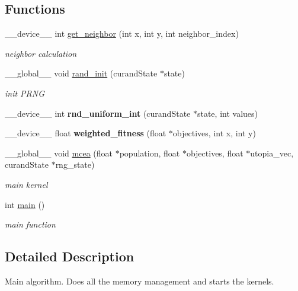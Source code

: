 \subsection*{Functions}
\begin{DoxyCompactItemize}
\item 
\+\_\+\+\_\+device\+\_\+\+\_\+ int \hyperlink{mcea_8cu_acab27e83eac8a2ce0b5e36cbaa955669}{get\+\_\+neighbor} (int x, int y, int neighbor\+\_\+index)
\begin{DoxyCompactList}\small\item\em neighbor calculation \end{DoxyCompactList}\item 
\+\_\+\+\_\+global\+\_\+\+\_\+ void \hyperlink{mcea_8cu_a5b010aff6f775f55f906e1e4c6fa34e1}{rand\+\_\+init} (curand\+State $\ast$state)
\begin{DoxyCompactList}\small\item\em init P\+R\+NG \end{DoxyCompactList}\item 
\+\_\+\+\_\+device\+\_\+\+\_\+ int {\bfseries rnd\+\_\+uniform\+\_\+int} (curand\+State $\ast$state, int values)\hypertarget{mcea_8cu_af0a71eeba147eeb4f476dd3a68ad324c}{}\label{mcea_8cu_af0a71eeba147eeb4f476dd3a68ad324c}

\item 
\+\_\+\+\_\+device\+\_\+\+\_\+ float {\bfseries weighted\+\_\+fitness} (float $\ast$objectives, int x, int y)\hypertarget{mcea_8cu_a0fa12716231f41a58666437c0a1f3afc}{}\label{mcea_8cu_a0fa12716231f41a58666437c0a1f3afc}

\item 
\+\_\+\+\_\+global\+\_\+\+\_\+ void \hyperlink{mcea_8cu_a31aedf86c33864d451f800c41c881afa}{mcea} (float $\ast$population, float $\ast$objectives, float $\ast$utopia\+\_\+vec, curand\+State $\ast$rng\+\_\+state)
\begin{DoxyCompactList}\small\item\em main kernel \end{DoxyCompactList}\item 
int \hyperlink{mcea_8cu_ae66f6b31b5ad750f1fe042a706a4e3d4}{main} ()
\begin{DoxyCompactList}\small\item\em main function \end{DoxyCompactList}\end{DoxyCompactItemize}


\subsection{Detailed Description}
Main algorithm. Does all the memory management and starts the kernels. 

